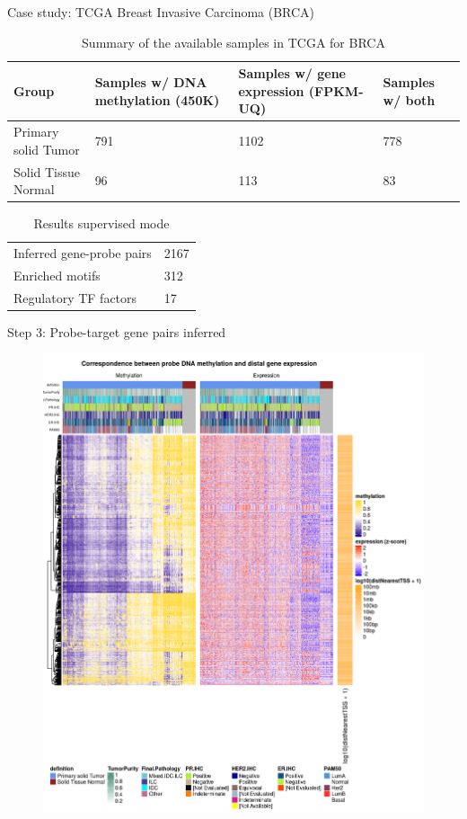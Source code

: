 \documentclass[slidestop,compress,11pt,xcolor=dvipsnames]{beamer}
\begin{document}
\begin{frame}{Case study: TCGA Breast Invasive Carcinoma (BRCA)}
 \begin{table}[ht!]
  \centering
  \caption{Summary of the available samples in TCGA for BRCA}
  \scriptsize

  \begin{tabular}{p{2.3cm}p{2.4cm}p{2.4cm}p{1cm}}
   \toprule
   Group               & Samples w/ DNA methylation (450K) & Samples w/ gene expression (FPKM-UQ) & Samples w/ both \\ \midrule
   Primary solid Tumor & 791                               & 1102                                 & 778             \\
   Solid Tissue Normal & 96                                & 113                                  & 83              \\
   \bottomrule
  \end{tabular}
 \end{table}

 \begin{table}[ht!]
  \centering
  \caption{Results supervised mode}
  \scriptsize

  \begin{tabular}{p{2.8cm}p{2.4cm}}
   \toprule
   Inferred gene-probe pairs & 2167 \\
   Enriched motifs           & 312  \\
   Regulatory TF factors     & 17   \\
   \bottomrule
  \end{tabular}
 \end{table}
\end{frame}


\begin{frame}{Step 3: Probe-target gene pairs inferred}
\vspace*{-0.5cm}
\begin{figure}
 \centering
   \includegraphics[width=0.75\linewidth]{ELMER/BRCA_heatmap.png}
   \end{figure}
\end{frame}
\end{document}
